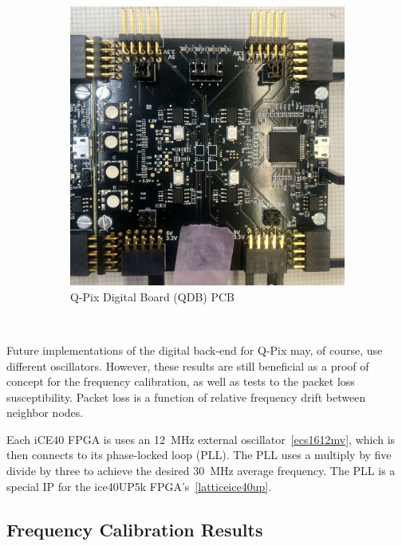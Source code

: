 \begin{figure}
\begin{subfigure}{.5\textwidth}
  \includegraphics[width=\textwidth]{images/qdb_closeup.jpg}
  \caption{Q-Pix Digital Board (QDB) PCB}
\end{subfigure}
\caption{}
\end{figure}~\label{fig:qdb_diagram}

Future implementations of the digital back-end for Q-Pix may, of course, use different oscillators.
However, these results are still beneficial as a proof of concept for the frequency calibration, as well as tests to the packet loss susceptibility.
Packet loss is a function of relative frequency drift between neighbor nodes.

Each iCE40 FPGA is uses an 12~\unit{MHz} external oscillator~\ref{ecs1612mv}, which is then connects to its phase-locked loop (PLL).
The PLL uses a multiply by five divide by three to achieve the desired 30~\unit{MHz} average frequency.
The PLL is a special IP for the ice40UP5k FPGA's~\ref{latticeice40up}.



\subsection{Frequency Calibration Results}



